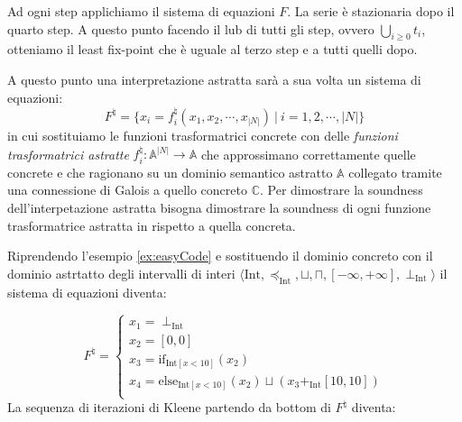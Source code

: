 \begin{example}
Ad ogni step applichiamo il sistema di equazioni \(F\). La serie è stazionaria dopo il quarto step. A questo punto facendo il lub di tutti gli step, ovvero \(\bigcup_{i\geq 0} t_i\), otteniamo il least fix-point che è uguale al terzo step e a tutti quelli dopo.
\end{example}

A questo punto una interpretazione astratta sarà a sua volta un sistema di equazioni:
\[F^{\natural} = \{x_i = f_i^{\natural}(x_1, x_2, \cdots, x_{|N|})\ |\ i=1, 2,\cdots, |N|\}\]
in cui sostituiamo le funzioni trasformatrici concrete con delle \textit{funzioni trasformatrici astratte} \(f_i^{\natural}:\mathbb{A}^{|N|}\rightarrow\mathbb{A}\) che approssimano correttamente quelle concrete e che ragionano su un dominio semantico astratto \(\mathbb{A}\) collegato tramite una connessione di Galois a quello concreto \(\mathbb{C}\). Per dimostrare la soundness dell'interpetazione astratta bisogna dimostrare la soundness di ogni funzione trasformatrice astratta in rispetto a quella concreta. 

Riprendendo l'esempio \ref{ex:easyCode} e sostituendo il dominio concreto con il dominio astrtatto degli intervalli di interi \(\langle\textrm{Int}, \preceq_{\textrm{Int}}, \sqcup, \sqcap, [-\infty, +\infty], \perp_{\textrm{Int}} \rangle\) il sistema di equazioni diventa: 

\[
F^{\natural} = 
\begin{cases}
   x_1 = \perp_{\textrm{Int}} \\ 
   x_2 = [0, 0] \\
   x_3 = \textrm{if}_{\textrm{Int}[x < 10]}(x_2) \\
   x_4 = \textrm{else}_{\textrm{Int}[x < 10]}(x_2) \sqcup (x_3 +_{\textrm{Int}} [10, 10]) \\
\end{cases}
\]
La sequenza di iterazioni di Kleene partendo da bottom di \(F^{\natural}\) diventa:

